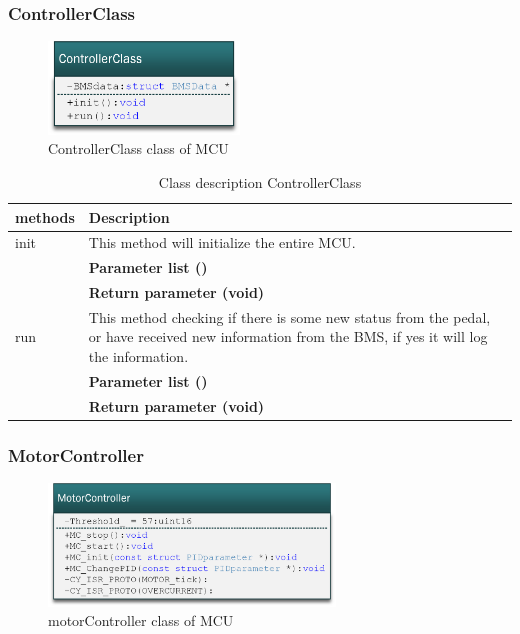 \subsubsection{ControllerClass}

\begin{figure}[H]
	\centering
	\includegraphics [width=2in]{Software/Pictures/class-diagram-controllerClass.png}
	\caption{ControllerClass class of MCU}
	\label{fig:Class_diagram_MCU_ControllerClass}
\end{figure}

\begin{table}[H]
	\centering
	\begin{tabular}{|p{5 cm}|p{10 cm}|}
		\hline
		\textbf{methods} & \textbf{Description} \\ \hline
		
		init
		& This method will initialize the entire MCU.
		\\ & \textbf{Parameter list ()}
		\\ & \textbf{Return parameter (void)}
		\\ \hline
		
		run
		& This method checking if there is some new status from the pedal, or have received new information from the BMS, if yes it will log the information. 
		\\ & \textbf{Parameter list ()}
		\\ & \textbf{Return parameter (void)}
		\\ \hline
		
	\end{tabular}
	\caption{Class description ControllerClass}
	\label{table:Class_description_ControllerClass_MCU}
\end{table}

\subsubsection{MotorController}

\begin{figure}[H]
	\centering
	\includegraphics [width=3in]{Software/Pictures/class-diagram-motorControllerClass.png}
	\caption{motorController class of MCU}
	\label{fig:Class_diagram_MCU_motorControllerClass}
\end{figure}

